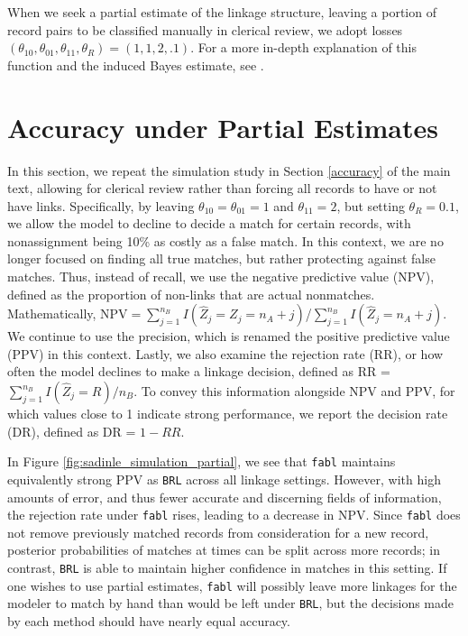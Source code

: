 \documentclass[ba]{imsart}
\begin{document}
When we seek a partial estimate of the linkage structure, leaving a portion of record pairs to be classified manually in clerical review, we adopt losses $(\theta_{10}, \theta_{01}, \theta_{11}, \theta_R) = (1, 1, 2, .1)$. For a more in-depth explanation of this function and the induced Bayes estimate, see \cite{sadinle_bayesian_2017}.


	\hypertarget{partial}{%
	\section{Accuracy under Partial Estimates}\label{partial}}

In this section, we repeat the simulation study in Section \ref{accuracy} of the main text, allowing for clerical review rather than forcing all records to have or not have links.  Specifically, by leaving $\theta_{10} = \theta_{01} = 1$ and $\theta_{11} = 2$, but setting $\theta_R = 0.1$, we allow the model to decline to decide a match for certain records, with nonassignment being 10\% as costly as a false match. In this context, we are no longer focused on finding all true matches, but rather protecting against false matches. Thus, instead of recall, we use the negative predictive value (NPV), defined as the proportion of non-links that are actual nonmatches. Mathematically, $\text{NPV} = \sum_{j=1}^{n_B} I(\hat{Z}_j = Z_j = n_A + j)$/$\sum_{j=1}^{n_B} I(\hat{Z}_j = n_A + j)$. We continue to use the precision, which is renamed the positive predictive value (PPV) in this context. Lastly, we also examine the rejection rate (RR), or how often the model declines to make a linkage decision, defined as RR = $\sum_{j=1}^{n_B} I(\hat{Z}_j = R)/n_B$. To convey this information alongside NPV and PPV, for which values close to 1 indicate strong performance, we report the decision rate (DR), defined as DR = $1 - RR$.

In Figure \ref{fig:sadinle_simulation_partial}, we see that \texttt{fabl} maintains equivalently strong PPV as \texttt{BRL} across all linkage settings. However, with high amounts of error, and thus fewer accurate and discerning fields of information, the rejection rate under \texttt{fabl} rises, leading to a decrease in NPV. Since \texttt{fabl} does not remove previously matched records from consideration for a new record, posterior probabilities of matches at times can be split across more records; in contrast, \texttt{BRL} is able to maintain higher confidence in matches in this setting. If one wishes to use partial estimates, \texttt{fabl} will possibly leave more linkages for the modeler to match by hand than would be left under \texttt{BRL}, but the decisions made by each method should have nearly equal accuracy. 
\end{document}
